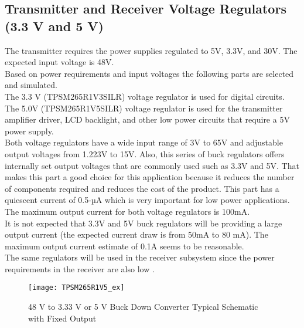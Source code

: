 \documentclass[12pt]{article}
\begin{document}
\subsection{Transmitter and Receiver Voltage Regulators (3.3 V and 5 V)}

\indent \indent
The transmitter requires the power supplies regulated to 5V, 3.3V, and 30V. The expected input voltage is 48V. \\
Based on power requirements and input voltages the following parts are selected and simulated.  \\

\indent
The 3.3 V (TPSM265R1V3SILR) voltage regulator is used for digital circuits. \\

\indent
The 5.0V (TPSM265R1V5SILR) voltage regulator is used for the transmitter amplifier driver, LCD backlight, and other low power circuits that require a 5V power supply. \\

\indent
Both voltage regulators have a wide input range of 3V to 65V and adjustable output voltages from 1.223V to 15V. Also, this series of buck regulators offers internally set output voltages that are commonly used such as 3.3V and 5V. That makes this part a good choice for this application because it reduces the number of components required and reduces the cost of the product. This part has a quiescent current of 0.5-µA which is very important for low power applications. \\

\indent
The maximum output current for both voltage regulators is 100mA. \\

\indent
It is not expected that 3.3V and 5V buck regulators will be providing a large output current (the expected current draw is from 50mA to 80 mA). The maximum output current estimate of 0.1A seems to be reasonable. \\

\indent
The same regulators will be used in the receiver subsystem since the power requirements in the receiver are also low \cite{TPSM265R1}.\\

\begin{figure}[h!]
\centering
\texttt{[image: TPSM265R1V5\_ex]}
\caption{48 V to 3.33 V or 5 V Buck Down Converter Typical Schematic with Fixed Output \cite{TPSM265R1}}
\end{figure}
\end{document}
